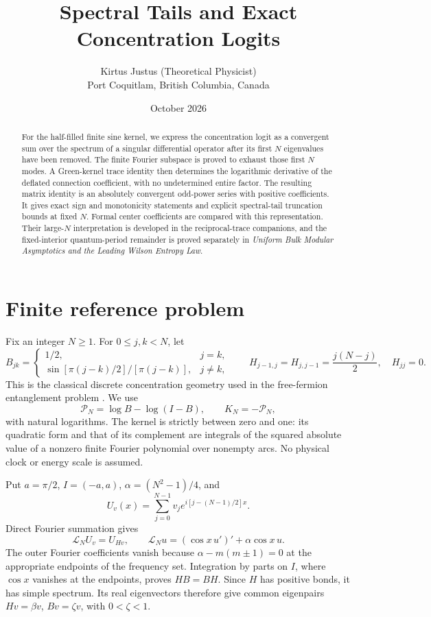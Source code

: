 \documentclass[10pt]{article}
\title{Spectral Tails and Exact Concentration Logits}
\author{Kirtus Justus (Theoretical Physicist)\\
\small Port Coquitlam, British Columbia, Canada}
\date{October 2026}
\begin{document}
\maketitle
\begin{abstract}
For the half-filled finite sine kernel, we express the concentration logit
as a convergent sum over the spectrum of a singular differential operator
after its first $N$ eigenvalues have been removed. The finite Fourier
subspace is proved to exhaust those first $N$ modes. A Green-kernel trace
identity then determines the logarithmic derivative of the deflated
connection coefficient, with no undetermined entire factor. The resulting
matrix identity is an absolutely convergent odd-power series with positive
coefficients. It gives exact sign and monotonicity statements and explicit
spectral-tail truncation bounds at fixed $N$. Formal center coefficients
are compared with this representation. Their large-$N$ interpretation is developed in the reciprocal-trace companions, and the fixed-interior quantum-period remainder is proved separately in \emph{Uniform Bulk Modular Asymptotics and the Leading Wilson Entropy Law}.
\end{abstract}

\section{Finite reference problem}
Fix an integer $N\ge1$. For $0\le j,k<N$, let
\begin{equation}
B_{jk}=\begin{cases}1/2,&j=k,\\
\sin[\pi(j-k)/2]/[\pi(j-k)],&j\ne k,\end{cases}
\qquad
H_{j-1,j}=H_{j,j-1}=\frac{j(N-j)}2,\quad H_{jj}=0.
\label{eq:matrices}
\end{equation}
This is the classical discrete concentration geometry used in the
free-fermion entanglement problem \cite{eisler}. We use
\begin{equation}
\mathcal P_N=\log B-\log(I-B),\qquad K_N=-\mathcal P_N,
\label{eq:modular}
\end{equation}
with natural logarithms. The kernel is strictly between zero and one:
its quadratic form and that of its complement are integrals of the
squared absolute value of a nonzero finite Fourier polynomial over
nonempty arcs. No physical clock or energy scale is assumed.

Put $a=\pi/2$, $I=(-a,a)$, $\alpha=(N^2-1)/4$, and
\begin{equation}
U_v(x)=\sum_{j=0}^{N-1}v_j e^{i[j-(N-1)/2]x}.
\end{equation}
Direct Fourier summation gives
\begin{equation}
\mathcal L_N U_v=U_{Hv},\qquad
\mathcal L_N u=(\cos x\,u')'+\alpha\cos x\,u.
\label{eq:Fourier}
\end{equation}
The outer Fourier coefficients vanish because
$\alpha-m(m\pm1)=0$ at the appropriate endpoints of the frequency set.
Integration by parts on $I$, where $\cos x$ vanishes at the endpoints,
proves $HB=BH$. Since $H$ has positive bonds, it has simple spectrum.
Its real eigenvectors therefore give common eigenpairs
$Hv=\beta v$, $Bv=\zeta v$, with $0<\zeta<1$.
\end{document}
